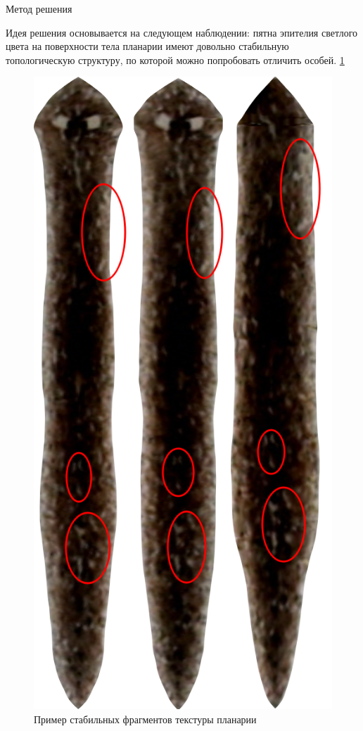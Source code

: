 \documentclass{article}
\begin{document}
\begin{section}{Метод решения}

Идея решения основывается на следующем наблюдении: пятна эпителия светлого цвета на поверхности тела планарии имеют довольно стабильную топологическую структуру, по которой можно попробовать отличить особей. \ref{fig2}

\begin{figure}[H]
\centering
\includegraphics[scale=0.4]{character.png}
\caption{Пример стабильных фрагментов текстуры планарии}
\label{fig2}
\end{figure}


\end{section}
\end{document}
